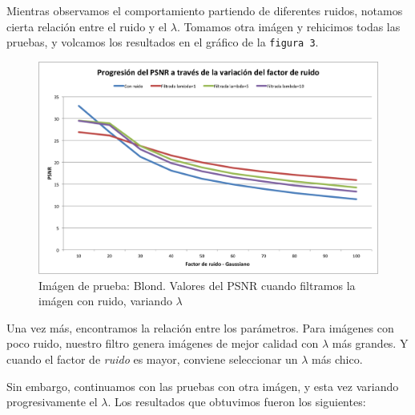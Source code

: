 \documentclass[a4paper]{article}
\begin{document}
Mientras observamos el comportamiento partiendo de diferentes ruidos, notamos cierta relación entre el ruido y el $\lambda$.
Tomamos otra imágen y rehicimos todas las pruebas, y volcamos los resultados en el gráfico de la \texttt{figura 3}. 

\begin{figure}[H]
  \centering
  \includegraphics[scale=0.65]{graficos/PSNR_Blond.png}
  \caption{ Imágen de prueba: Blond. Valores del PSNR cuando filtramos la imágen con ruido, variando $\lambda$}
\end{figure}

Una vez más, encontramos la relación entre los parámetros. Para imágenes con poco ruido, nuestro filtro genera imágenes de mejor calidad con $\lambda$ más grandes. Y cuando el factor de \textit{ruido} es mayor, conviene seleccionar un $\lambda$ más chico.

Sin embargo, continuamos con las pruebas con otra imágen, y esta vez variando progresivamente el $\lambda$. Los resultados que obtuvimos fueron los siguientes: 
\end{document}

